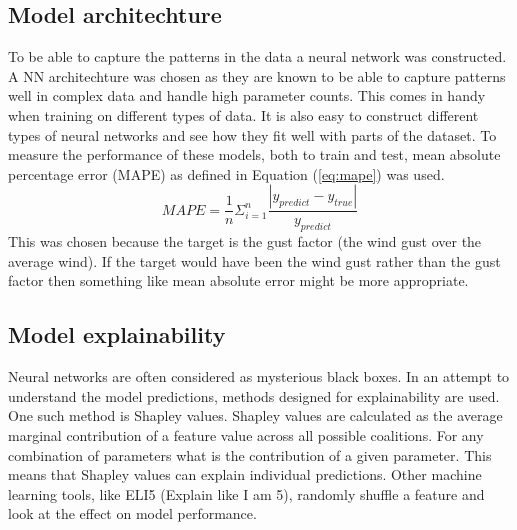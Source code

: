 \subsection{Model architechture}
To be able to capture the patterns in the data a neural network was constructed. A NN architechture was chosen as they are known to be able to capture patterns well in complex data and handle high parameter counts. This comes in handy when training on different types of data. It is also easy to construct different types of neural networks and see how they fit well with parts of the dataset. To measure the performance of these models, both to train and test, mean absolute percentage error (MAPE) as defined in Equation (\ref{eq:mape}) was used.
\begin{equation}
    \label{eq:mape}
    MAPE = \frac{1}{n}\Sigma_{i=1}^n\frac{|y_{predict} - y_{true}|}{y_{predict}}
\end{equation}
This was chosen because the target is the gust factor (the wind gust over the average wind). If the target would have been the wind gust rather than the gust factor then something like mean absolute error might be more appropriate.

\subsection{Model explainability}
Neural networks are often considered as mysterious black boxes\cite{nn_black_box}. In an attempt to understand the model predictions, methods designed for explainability are used. One such method is Shapley values\cite{shapley_information}. Shapley values are calculated as the average marginal contribution of a feature value across all possible coalitions. For any combination of parameters what is the contribution of a given parameter. This means that Shapley values can explain individual predictions. Other machine learning tools, like ELI5 (Explain like I am  5), randomly shuffle a feature and look at the effect on model performance\cite{eli5_information}.